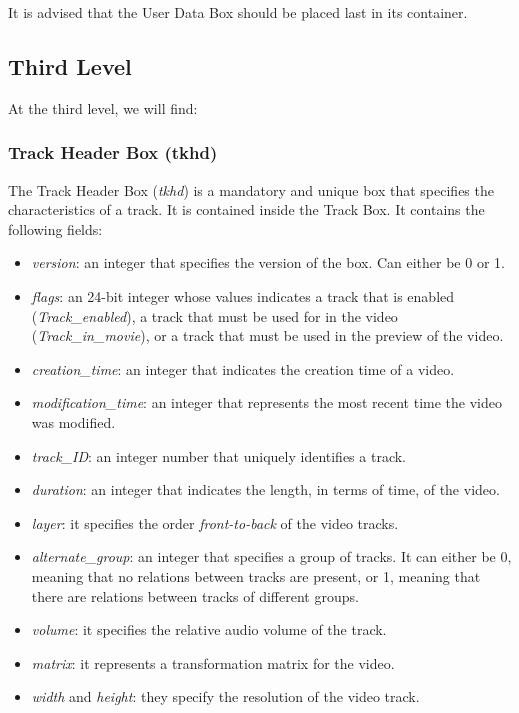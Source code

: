 It is advised that the User Data Box should be placed last in its container.

\subsection{Third Level}

At the third level, we will find:

\subsubsection*{Track Header Box (tkhd)}

The Track Header Box (\emph{tkhd}) is a mandatory and unique box that specifies the characteristics of a track. It is contained inside the Track Box. It contains the following fields:

\begin{itemize}
\item \emph{version}: an integer that specifies the version of the box. Can either be 0 or 1.
\item \emph{flags}: an 24-bit integer whose values indicates a track that is enabled (\emph{Track\_enabled}), a track that must be used for in the video (\emph{Track\_in\_movie}), or a track that must be used in the preview of the video.
\item \emph{creation\_time}: an integer that indicates the creation time of a video.
\item \emph{modification\_time}: an integer that represents the most recent time the video was modified.
\item \emph{track\_ID}: an integer number that uniquely identifies a track.
\item \emph{duration}: an integer that indicates the length, in terms of time, of the video.
\item \emph{layer}: it specifies the order \emph{front-to-back} of the video tracks.
\item \emph{alternate\_group}: an integer that specifies a group of tracks. It can either be 0, meaning that no relations between tracks are present, or 1, meaning that there are relations between tracks of different groups.
\item \emph{volume}: it specifies the relative audio volume of the track.
\item \emph{matrix}: it represents a transformation matrix for the video.
\item \emph{width} and \emph{height}: they specify the resolution of the video track.
\end{itemize}

